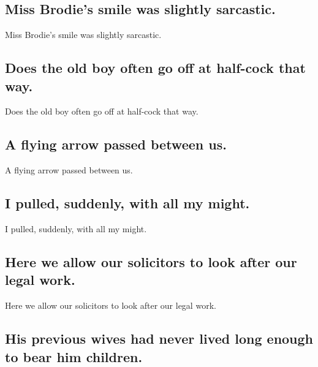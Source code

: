 \documentclass[]{article}
\begin{document}
\hypertarget{miss-brodies-smile-was-slightly-sarcastic.}{%
\subsection{Miss Brodie's smile was slightly
sarcastic.}\label{miss-brodies-smile-was-slightly-sarcastic.}}

Miss Brodie's smile was slightly sarcastic.

\hypertarget{does-the-old-boy-often-go-off-at-half-cock-that-way.}{%
\subsection{Does the old boy often go off at half-cock that
way.}\label{does-the-old-boy-often-go-off-at-half-cock-that-way.}}

Does the old boy often go off at half-cock that way.

\hypertarget{a-flying-arrow-passed-between-us.}{%
\subsection{A flying arrow passed between
us.}\label{a-flying-arrow-passed-between-us.}}

A flying arrow passed between us.

\hypertarget{i-pulled-suddenly-with-all-my-might.}{%
\subsection{I pulled, suddenly, with all my
might.}\label{i-pulled-suddenly-with-all-my-might.}}

I pulled, suddenly, with all my might.

\hypertarget{here-we-allow-our-solicitors-to-look-after-our-legal-work.}{%
\subsection{Here we allow our solicitors to look after our legal
work.}\label{here-we-allow-our-solicitors-to-look-after-our-legal-work.}}

Here we allow our solicitors to look after our legal work.

\hypertarget{his-previous-wives-had-never-lived-long-enough-to-bear-him-children.}{%
\subsection{His previous wives had never lived long enough to bear him
children.}\label{his-previous-wives-had-never-lived-long-enough-to-bear-him-children.}}
\end{document}
